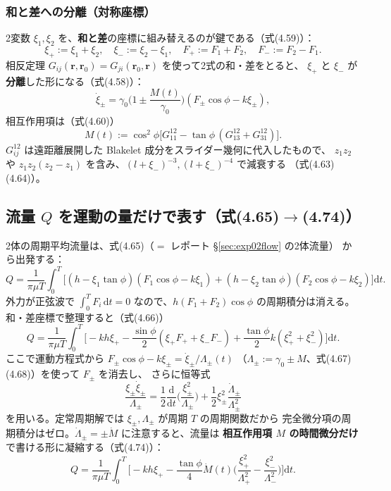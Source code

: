 \documentclass[11pt,a4paper]{article}
\newcommand{\rv}{\bm{r}}
\newcommand{\gamz}{\gamma_{0}}
\newcommand{\dd}{\mathrm{d}}
\begin{document}
\subsubsection{和と差への分離（対称座標）}

2変数 $\xi_1,\xi_2$ を、\textbf{和と差}の座標に組み替えるのが鍵である（式(4.59)）：
\begin{equation}
\xi_+:=\xi_1+\xi_2,\quad \xi_-:=\xi_2-\xi_1,\quad
F_+:=F_1+F_2,\quad F_-:=F_2-F_1.
\end{equation}
相反定理 $G_{ij}(\rv,\rv_0)=G_{ji}(\rv_0,\rv)$ を使って2式の和・差をとると、
$\xi_+$ と $\xi_-$ が\textbf{分離}した形になる（式(4.58)）：
\begin{equation}
\dot\xi_\pm=\gamz\Big(1\pm\frac{M(t)}{\gamz}\Big)(F_\pm\cos\phi-k\xi_\pm),
\end{equation}
相互作用項は（式(4.60)）
\begin{equation}
M(t):=\cos^2\!\phi\big[G_{11}^{12}-\tan\phi\,(G_{13}^{12}+G_{31}^{12})\big].
\end{equation}
$G^{12}_{ij}$ は遠距離展開した Blakelet 成分をスライダー幾何に代入したもので、
$z_1z_2$ や $z_1z_2(z_2-z_1)$ を含み、$(l+\xi_-)^{-3},(l+\xi_-)^{-4}$ で減衰する
（式(4.63)(4.64)）。

\subsection{流量 $Q$ を運動の量だけで表す（式(4.65)$\to$(4.74)）}

2体の周期平均流量は、式(4.65)（$=$ レポート §\ref{sec:exp02flow} の2体流量）
から出発する：
\begin{equation}
Q=\frac{1}{\pi\mu T}\int_0^T\!\big[(h-\xi_1\tan\phi)(F_1\cos\phi-k\xi_1)
+(h-\xi_2\tan\phi)(F_2\cos\phi-k\xi_2)\big]\dd t.
\end{equation}
外力が正弦波で $\int_0^T F_i\,\dd t=0$ なので、$h(F_1+F_2)\cos\phi$ の周期積分は消える。
和・差座標で整理すると（式(4.66)）
\begin{equation}
Q=\frac{1}{\pi\mu T}\int_0^T\!\Big[-kh\xi_+
-\frac{\sin\phi}{2}(\xi_+F_++\xi_-F_-)
+\frac{\tan\phi}{2}k(\xi_+^2+\xi_-^2)\Big]\dd t.
\end{equation}
ここで運動方程式から $F_\pm\cos\phi-k\xi_\pm=\dot\xi_\pm/\Lambda_\pm(t)$
（$\Lambda_\pm:=\gamz\pm M$、式(4.67)(4.68)）を使って $F_\pm$ を消去し、
さらに恒等式
\begin{equation}
\frac{\xi_\pm\dot\xi_\pm}{\Lambda_\pm}
=\frac{1}{2}\frac{\dd}{\dd t}\Big(\frac{\xi_\pm^2}{\Lambda_\pm}\Big)
+\frac{1}{2}\xi_\pm^2\frac{\dot\Lambda_\pm}{\Lambda_\pm^2}
\end{equation}
を用いる。定常周期解では $\xi_\pm,\Lambda_\pm$ が周期 $T$ の周期関数だから
完全微分項の周期積分はゼロ。$\dot\Lambda_\pm=\pm\dot M$ に注意すると、流量は
\textbf{相互作用項 $M$ の時間微分だけ}で書ける形に凝縮する（式(4.74)）：
\begin{equation}
\boxed{\;Q=\frac{1}{\pi\mu T}\int_0^T\Big[-kh\xi_+
-\frac{\tan\phi}{4}\dot M(t)\Big(\frac{\xi_+^2}{\Lambda_+^2}-\frac{\xi_-^2}{\Lambda_-^2}\Big)\Big]\dd t.\;}
\end{equation}
\end{document}

